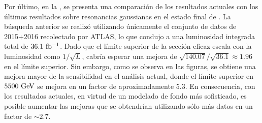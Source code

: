 Por último, en la \Fig{\ref{fig:results:results:bkgsig:results:gaus:limits_comparison_old}}, se presenta una comparación de los resultados actuales con los últimos resultados sobre resonancias gaussianas en el estado final de \gammajet. La búsqueda anterior se realizó utilizando únicamente el conjunto de datos de 2015+2016 recolectado por \ac{ATLAS}, lo que condujo a una luminosidad integrada total de \(36.1~\ifb\). Dado que el límite superior de la sección eficaz escala con la luminosidad como \(1 / \sqrt{L}\), cabría esperar una mejora de \(\sqrt{140.07} / \sqrt{36.1} \approx 1.96\) en el límite superior. Sin embargo, como se observa en las figuras, se obtiene una mejora mayor de la sensibilidad en el análisis actual, donde el límite superior en \(5500~\gev\) se mejora en un factor de aproximadamente 5.3. En consecuencia, con los resultados actuales, en virtud de un modelado de fondo más sofisticado, es posible aumentar las mejoras que se obtendrían utilizando sólo más datos en un factor de \(\sim 2.7\).